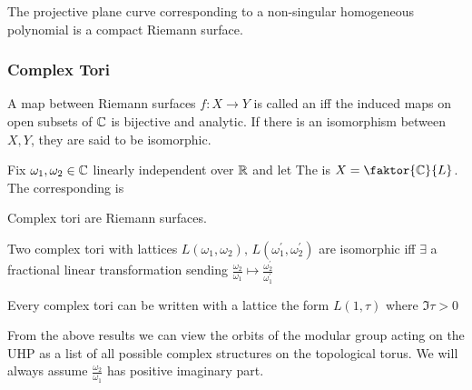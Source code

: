 \documentclass{article}
\begin{document}
\begin{prop}
	The projective plane curve corresponding to a non-singular homogeneous polynomial is a compact Riemann surface. 
\end{prop}

\subsubsection{Complex Tori}

\begin{definition}
	A map between Riemann surfaces $f:X \to Y$ is called an  iff the induced maps on open subsets of $\mathbb{C}$ is bijective and analytic. If there is an isomorphism between $X,Y$, they are said to be isomorphic.  
\end{definition}

\begin{definition}
	Fix $\omega_1, \omega_2 \in \mathbb{C}$ linearly independent over $\mathbb{R}$ and let 
The  is $X = \faktor{\mbb{C}}{L}$. The corresponding  is 
\eq{
\mf{F} = \mf{F}(X) = \pbrace{\alpha \omega_1+ \beta \omega_2 \, | \, \alpha,\beta \in [0,1)}
}
\end{definition}

\begin{prop}
	Complex tori are Riemann surfaces. 
\end{prop}

\begin{prop}
	Two complex tori with lattices $L(\omega_1, \omega_2), \, L(\omega_1^\prime, \omega_2^\prime)$ are isomorphic iff $\exists$ a fractional linear transformation sending $\frac{\omega_2}{\omega_1} \mapsto \frac{\omega_2^\prime}{\omega_1^\prime}$
\end{prop}

\begin{prop}
	Every complex tori can be written with a lattice the form $L(1,\tau)$ where $\Im\tau > 0$
\end{prop}

\begin{remark}
	From the above results we can view the orbits of the modular group acting on the UHP as a list of all possible complex structures on the topological torus. We will always assume $\frac{\omega_2}{\omega_1}$ has positive imaginary part.  
\end{remark}
\end{document}

